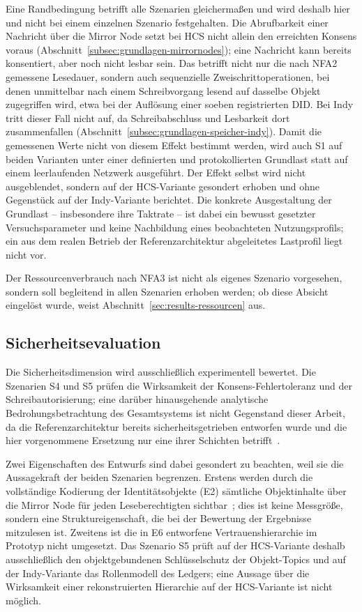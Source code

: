 Eine Randbedingung betrifft alle Szenarien gleichermaßen und wird deshalb hier und nicht bei einem einzelnen Szenario festgehalten. Die Abrufbarkeit einer Nachricht über die Mirror Node setzt bei HCS nicht allein den erreichten Konsens voraus (Abschnitt~\ref{subsec:grundlagen-mirrornodes}); eine Nachricht kann bereits konsentiert, aber noch nicht lesbar sein. Das betrifft nicht nur die nach NFA2 gemessene Lesedauer, sondern auch sequenzielle Zweischrittoperationen, bei denen unmittelbar nach einem Schreibvorgang lesend auf dasselbe Objekt zugegriffen wird, etwa bei der Auflösung einer soeben registrierten DID. Bei Indy tritt dieser Fall nicht auf, da Schreibabschluss und Lesbarkeit dort zusammenfallen (Abschnitt~\ref{subsec:grundlagen-speicher-indy}). Damit die gemessenen Werte nicht von diesem Effekt bestimmt werden, wird auch S1 auf beiden Varianten unter einer definierten und protokollierten Grundlast statt auf einem leerlaufenden Netzwerk ausgeführt. Der Effekt selbst wird nicht ausgeblendet, sondern auf der HCS-Variante gesondert erhoben und ohne Gegenstück auf der Indy-Variante berichtet. Die konkrete Ausgestaltung der Grundlast -- insbesondere ihre Taktrate -- ist dabei ein bewusst gesetzter Versuchsparameter und keine Nachbildung eines beobachteten Nutzungsprofils; ein aus dem realen Betrieb der Referenzarchitektur abgeleitetes Lastprofil liegt nicht vor.

Der Ressourcenverbrauch nach NFA3 ist nicht als eigenes Szenario vorgesehen, sondern soll begleitend in allen Szenarien erhoben werden; ob diese Absicht eingelöst wurde, weist Abschnitt~\ref{sec:results-ressourcen} aus.


\subsection{Sicherheitsevaluation}
\label{subsec:eval-sicherheit}

Die Sicherheitsdimension wird ausschließlich experimentell bewertet. Die Szenarien S4 und S5 prüfen die Wirksamkeit der Konsens-Fehlertoleranz und der Schreibautorisierung; eine darüber hinausgehende analytische Bedrohungsbetrachtung des Gesamtsystems ist nicht Gegenstand dieser Arbeit, da die Referenzarchitektur bereits sicherheitsgetrieben entworfen wurde und die hier vorgenommene Ersetzung nur eine ihrer Schichten betrifft~\cite{erler2023}.

Zwei Eigenschaften des Entwurfs sind dabei gesondert zu beachten, weil sie die Aussagekraft der beiden Szenarien begrenzen. Erstens werden durch die vollständige Kodierung der Identitätsobjekte (E2) sämtliche Objektinhalte über die Mirror Node für jeden Leseberechtigten sichtbar~\cite{satybaldy2026}; dies ist keine Messgröße, sondern eine Struktureigenschaft, die bei der Bewertung der Ergebnisse mitzulesen ist. Zweitens ist die in E6 entworfene Vertrauenshierarchie im Prototyp nicht umgesetzt. Das Szenario S5 prüft auf der HCS-Variante deshalb ausschließlich den objektgebundenen Schlüsselschutz der Objekt-Topics und auf der Indy-Variante das Rollenmodell des Ledgers; eine Aussage über die Wirksamkeit einer rekonstruierten Hierarchie auf der HCS-Variante ist nicht möglich.


